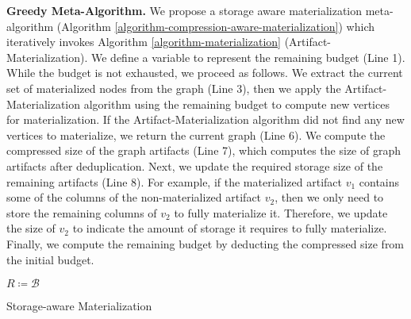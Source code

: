 \textbf{Greedy Meta-Algorithm.}
We propose a storage aware materialization meta-algorithm (Algorithm \ref{algorithm-compression-aware-materialization}) which iteratively invokes Algorithm \ref{algorithm-materialization} (Artifact-Materialization).
We define a variable to represent the remaining budget (Line 1).
While the budget is not exhausted, we proceed as follows.
We extract the current set of materialized nodes from the graph (Line 3), then we apply the Artifact-Materialization algorithm using the remaining budget to compute new vertices for materialization.
If the Artifact-Materialization algorithm did not find any new vertices to materialize, we return the current graph (Line 6).
We compute the compressed size of the graph artifacts (Line 7), which computes the size of graph artifacts after deduplication. 
Next, we update the required storage size of the remaining artifacts (Line 8).
For example, if the materialized artifact $v_1$ contains some of the columns of the non-materialized artifact $v_2$, then we only need to store the remaining columns of $v_2$ to fully materialize it.
Therefore, we update the size of $v_2$ to indicate the amount of storage it requires to fully materialize.
Finally, we compute the remaining budget by deducting the compressed size from the initial budget.
\begin{algorithm}[h]
$R \coloneqq  \mathcal{B}$ \;
\caption{Storage-aware Materialization}\label{algorithm-compression-aware-materialization}
\end{algorithm}


